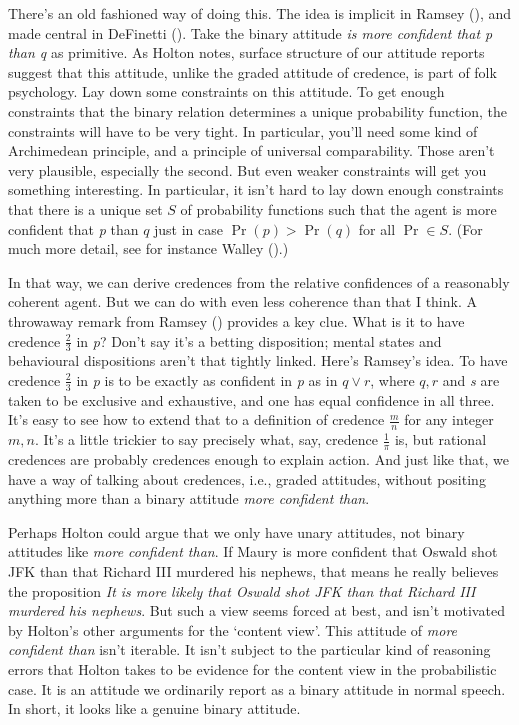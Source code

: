 \documentclass[
  10pt,
  letterpaper,
  DIV=11,
  numbers=noendperiod,
  twoside]{scrartcl}
\begin{document}
There's an old fashioned way of doing this. The idea is implicit in
Ramsey (), and made central in
DeFinetti (). Take the binary attitude
\emph{is more confident that p than q} as primitive. As Holton notes,
surface structure of our attitude reports suggest that this attitude,
unlike the graded attitude of credence, is part of folk psychology. Lay
down some constraints on this attitude. To get enough constraints that
the binary relation determines a unique probability function, the
constraints will have to be very tight. In particular, you'll need some
kind of Archimedean principle, and a principle of universal
comparability. Those aren't very plausible, especially the second. But
even weaker constraints will get you something interesting. In
particular, it isn't hard to lay down enough constraints that there is a
unique set \(S\) of probability functions such that the agent is more
confident that \emph{p} than \(q\) just in case \(\Pr( p) > \Pr(q)\) for
all \(\Pr \in S\). (For much more detail, see for instance Walley
().)

In that way, we can derive credences from the relative confidences of a
reasonably coherent agent. But we can do with even less coherence than
that I think. A throwaway remark from Ramsey
() provides a key clue. What is it
to have credence \(\frac{2}{3}\) in \emph{p}? Don't say it's a betting
disposition; mental states and behavioural dispositions aren't that
tightly linked. Here's Ramsey's idea. To have credence \(\frac{2}{3}\)
in \emph{p} is to be exactly as confident in \emph{p} as in
\(q \vee r\), where \(q, r\) and \emph{s} are taken to be exclusive and
exhaustive, and one has equal confidence in all three. It's easy to see
how to extend that to a definition of credence \(\frac{m}{n}\) for any
integer \(m, n\). It's a little trickier to say precisely what, say,
credence \(\frac{1}{\pi}\) is, but rational credences are probably
credences enough to explain action. And just like that, we have a way of
talking about credences, i.e., graded attitudes, without positing
anything more than a binary attitude \emph{more confident than}.

Perhaps Holton could argue that we only have unary attitudes, not binary
attitudes like \emph{more confident than}. If Maury is more confident
that Oswald shot JFK than that Richard III murdered his nephews, that
means he really believes the proposition \emph{It is more likely that
Oswald shot JFK than that Richard III murdered his nephews}. But such a
view seems forced at best, and isn't motivated by Holton's other
arguments for the `content view'. This attitude of \emph{more confident
than} isn't iterable. It isn't subject to the particular kind of
reasoning errors that Holton takes to be evidence for the content view
in the probabilistic case. It is an attitude we ordinarily report as a
binary attitude in normal speech. In short, it looks like a genuine
binary attitude.
\end{document}
